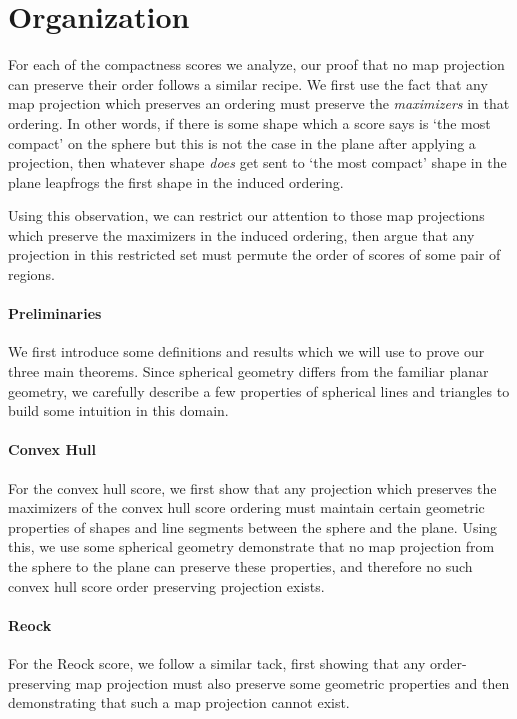 \section{Organization}


For each of the compactness scores we analyze, our proof that no map
projection can preserve their order follows a similar recipe. We
first use the fact that any map projection which preserves an ordering
must preserve the \textit{maximizers} in that ordering.  In other words,
if there is some shape which a score says is `the most compact' on the sphere 
but this is not the case in the plane after applying a projection, then whatever 
shape \textit{does} get sent to `the most compact' shape in the plane leapfrogs 
the first shape in the induced ordering.

Using this observation, we can restrict our attention to those map
projections which preserve the maximizers in the induced ordering,
then argue that any projection in this restricted set must permute the
order of scores of some pair of regions.


\paragraph{Preliminaries}
We first introduce some definitions and results which we will use to prove our 
three main theorems.  Since spherical geometry differs from the familiar planar geometry, 
we carefully describe a few properties of spherical lines and triangles to build some intuition 
in this domain. 


\paragraph{Convex Hull}
For the convex hull score, we first 
show that any projection which preserves the maximizers of the convex hull score 
ordering must maintain certain geometric properties of shapes and line segments 
between the sphere and the plane.  Using this, we use some spherical geometry demonstrate that no 
map projection from the sphere to the plane can preserve these properties, and therefore 
no such convex hull score order preserving projection exists.



\paragraph{Reock}
For the Reock score, we follow a similar tack, first showing that any 
order-preserving map projection must also preserve some geometric properties 
and then demonstrating that such a map projection cannot exist.





